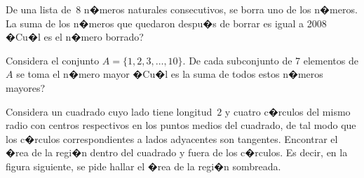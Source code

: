 \begin{Problema}{4}
  De una lista de~8 n�meros naturales consecutivos, se borra uno de
  los n�meros. La suma de los n�meros que quedaron despu�s de borrar
  es igual a 2008 �Cu�l es el n�mero borrado?
\end{Problema}

\begin{Solucion}
  
\end{Solucion}

\begin{Problema}{5}
  Considera el conjunto $A=\{1,2,3,\ldots,10\}$.  De cada subconjunto
  de 7 elementos de $A$ se toma el n�mero mayor �Cu�l es la suma de
  todos estos n�meros mayores?
\end{Problema}

\begin{Solucion}
  
\end{Solucion}

\begin{Problema}{6}
  Considera un cuadrado cuyo lado tiene longitud~$2$ y cuatro
  c�rculos del mismo radio con centros respectivos en los puntos
  medios del cuadrado, de tal modo que los c�rculos correspondientes a
  lados adyacentes son tangentes.  Encontrar el �rea de la regi�n
  dentro del cuadrado y fuera de los c�rculos. Es decir, en la figura
  siguiente, se pide hallar el �rea de la regi�n sombreada.

  \begin{center}

  \end{center}
\end{Problema}


